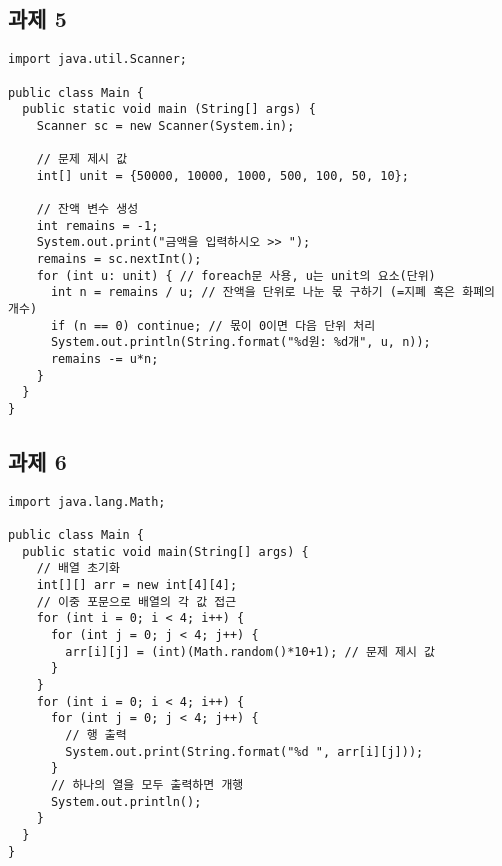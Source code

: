 \documentclass{article}
\begin{document}
\subsection{과제 5}
\begin{lstlisting}
import java.util.Scanner;

public class Main {
  public static void main (String[] args) {
    Scanner sc = new Scanner(System.in);
    
    // 문제 제시 값 
    int[] unit = {50000, 10000, 1000, 500, 100, 50, 10};

    // 잔액 변수 생성
    int remains = -1;
    System.out.print("금액을 입력하시오 >> ");
    remains = sc.nextInt();
    for (int u: unit) { // foreach문 사용, u는 unit의 요소(단위)
      int n = remains / u; // 잔액을 단위로 나눈 몫 구하기 (=지폐 혹은 화폐의 개수)
      if (n == 0) continue; // 몫이 0이면 다음 단위 처리
      System.out.println(String.format("%d원: %d개", u, n));
      remains -= u*n;
    }
  }
}
\end{lstlisting}
\subsection{과제 6}
\begin{lstlisting}
import java.lang.Math;

public class Main {
  public static void main(String[] args) {
    // 배열 초기화
    int[][] arr = new int[4][4];
    // 이중 포문으로 배열의 각 값 접근
    for (int i = 0; i < 4; i++) {
      for (int j = 0; j < 4; j++) {
        arr[i][j] = (int)(Math.random()*10+1); // 문제 제시 값
      }
    }
    for (int i = 0; i < 4; i++) {
      for (int j = 0; j < 4; j++) {
        // 행 출력
        System.out.print(String.format("%d ", arr[i][j]));
      }
      // 하나의 열을 모두 출력하면 개행
      System.out.println();
    }
  }
}
\end{lstlisting}
\end{document}
